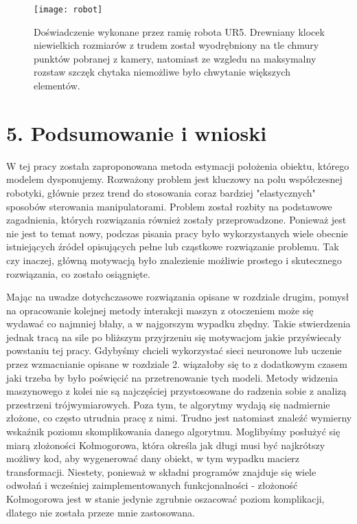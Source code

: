\documentclass{article}
\begin{document}
\newpage
\begin{figure}[h]
\centering
\texttt{[image: robot]}
\caption{Doświadczenie wykonane przez ramię robota UR5. Drewniany klocek niewielkich rozmiarów z trudem został wyodrębniony na tle chmury punktów pobranej z kamery, natomiast ze wzgledu na maksymalny rozstaw szczęk chytaka niemożliwe było chwytanie większych elementów.}
\end{figure}

\newpage
\section*{\LARGE{5. Podsumowanie i wnioski}} 

W tej pracy została zaproponowana metoda estymacji położenia obiektu, którego modelem dysponujemy. Rozważony problem jest kluczowy na polu współczesnej robotyki, głównie przez trend do stosowania coraz bardziej "elastycznych" sposobów sterowania manipulatorami. Problem został rozbity na podstawowe zagadnienia, których rozwiązania również zostały przeprowadzone. Ponieważ jest nie jest to temat nowy, podczas pisania pracy było wykorzystanych wiele obecnie istniejących źródeł opisujących pełne lub cząstkowe rozwiązanie problemu. Tak czy inaczej, główną motywacją było znalezienie możliwie prostego i skutecznego rozwiązania, co zostało osiągnięte. 

Mając na uwadze dotychczasowe rozwiązania opisane w rozdziale drugim, pomysł na opracowanie kolejnej metody interakcji maszyn z otoczeniem może się wydawać co najmniej błahy, a w najgorszym wypadku zbędny. Takie stwierdzenia jednak tracą na sile po bliższym przyjrzeniu się motywacjom jakie przyświecały powstaniu tej pracy. Gdybyśmy chcieli wykorzystać sieci neuronowe lub uczenie przez wzmacnianie opisane w rozdziale 2. wiązałoby się to z dodatkowym czasem jaki trzeba by było poświęcić na przetrenowanie tych modeli. Metody widzenia maszynowego z kolei nie są najczęściej przystosowane do radzenia sobie z analizą przestrzeni trójwymiarowych. Poza tym, te algorytmy wydają się nadmiernie złożone, co często utrudnia pracę z nimi. Trudno jest natomiast znaleźć wymierny wskaźnik poziomu skomplikowania danego algorytmu. Moglibyśmy posłużyć się miarą złożoności Kołmogorowa, która określa jak długi musi być najkrótszy możliwy kod, aby wygenerować dany obiekt, w tym wypadku macierz transformacji.  Niestety, ponieważ w składni programów znajduje się wiele odwołań i wcześniej zaimplementowanych funkcjonalności - złożoność Kołmogorowa jest w stanie jedynie zgrubnie oszacować poziom komplikacji, dlatego nie została przeze mnie zastosowana.
\end{document}

